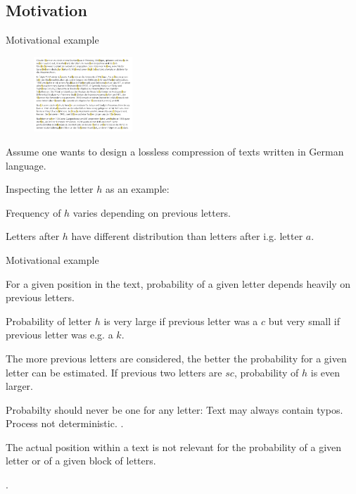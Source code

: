 \subsection{Motivation}

\begin{frame}{Motivational example}
\begin{figure}
\centering
\includegraphics[width=0.33\textwidth]{Lossless_II/Shannon_Bio.png}
\end{figure}
\bit
\item Assume one wants to design a lossless compression of texts written in German language.
\item Inspecting the letter $h$ as an example: 
\bit 
\item Frequency of $h$ varies depending on previous letters. 
\item Letters after $h$ have different distribution than letters after i.g. letter $a$. 
\eit 
\eit
\end{frame}



\begin{frame}{Motivational example}

\begin{minipage}[t]{0.8\linewidth}
 For a given position in the text,  probability of a given letter depends heavily 
on previous letters.
\bit\small
\item Probability of letter $h$ is very large if previous letter was a $c$ but very small if previous letter was e.g. a $k$. 
\item The more previous letters are considered, the better the probability for a given letter can be estimated. If previous
two letters are $sc$, probability of $h$ is even larger.  
\item Probabilty should never be one for any letter: Text may always contain typos. Process not deterministic.  
\eit
 . 
\end{minipage}

\begin{minipage}[t]{0.8\linewidth}
 The actual position within a text is not relevant for the probability of a given letter 
or of a given block of letters.

\smallskip
{}.
\end{minipage}

\end{frame}


